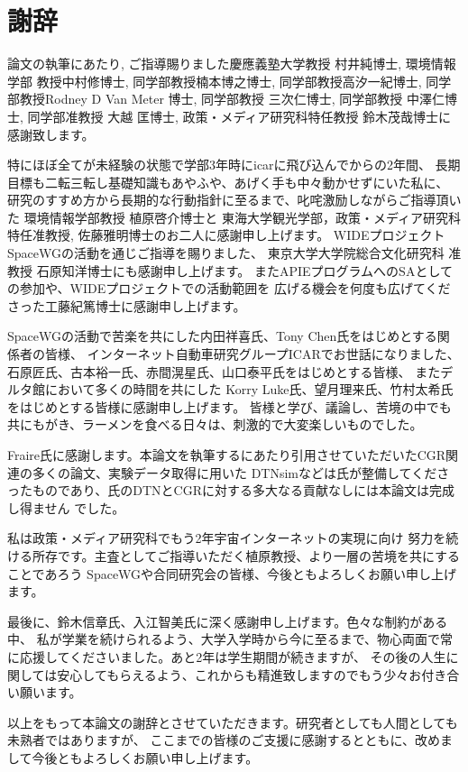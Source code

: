 \chapter*{謝辞}
論文の執筆にあたり, ご指導賜りました慶應義塾大学教授 村井純博士, 環境情報学部
教授中村修博士, 同学部教授楠本博之博士, 同学部教授高汐一紀博士, 同学部教授Rodney
D Van Meter 博士, 同学部教授 三次仁博士, 同学部教授 中澤仁博士, 同学部准教授 大越
匡博士, 政策・メディア研究科特任教授 鈴木茂哉博士に感謝致します。

特にほぼ全てが未経験の状態で学部3年時にicarに飛び込んでからの2年間、
長期目標も二転三転し基礎知識もあやふや、あげく手も中々動かせずにいた私に、
研究のすすめ方から長期的な行動指針に至るまで、叱咤激励しながらご指導頂いた
環境情報学部教授 植原啓介博士と
東海大学観光学部，政策・メディア研究科特任准教授, 佐藤雅明博士のお二人に感謝申し上げます。
WIDEプロジェクトSpaceWGの活動を通じご指導を賜りました、
東京大学大学院総合文化研究科 准教授 石原知洋博士にも感謝申し上げます。
またAPIEプログラムへのSAとしての参加や、WIDEプロジェクトでの活動範囲を
広げる機会を何度も広げてくださった工藤紀篤博士に感謝申し上げます。

SpaceWGの活動で苦楽を共にした内田祥喜氏、Tony Chen氏をはじめとする関係者の皆様、
インターネット自動車研究グループICARでお世話になりました、
石原匠氏、古本裕一氏、赤間滉星氏、山口泰平氏をはじめとする皆様、
またデルタ館において多くの時間を共にした
Korry Luke氏、望月理来氏、竹村太希氏をはじめとする皆様に感謝申し上げます。
皆様と学び、議論し、苦境の中でも共にもがき、ラーメンを食べる日々は、刺激的で大変楽しいものでした。

Fraire氏に感謝します。本論文を執筆するにあたり引用させていただいたCGR関連の多くの論文、実験データ取得に用いた
DTNsimなどは氏が整備してくださったものであり、氏のDTNとCGRに対する多大なる貢献なしには本論文は完成し得ません
でした。

私は政策・メディア研究科でもう2年宇宙インターネットの実現に向け
努力を続ける所存です。主査としてご指導いただく植原教授、より一層の苦境を共にすることであろう
SpaceWGや合同研究会の皆様、今後ともよろしくお願い申し上げます。

最後に、鈴木信章氏、入江智美氏に深く感謝申し上げます。色々な制約がある中、
私が学業を続けられるよう、大学入学時から今に至るまで、物心両面で常に応援してくださいました。あと2年は学生期間が続きますが、
その後の人生に関しては安心してもらえるよう、これからも精進致しますのでもう少々お付き合い願います。

以上をもって本論文の謝辞とさせていただきます。研究者としても人間としても未熟者ではありますが、
ここまでの皆様のご支援に感謝するとともに、改めまして今後ともよろしくお願い申し上げます。


